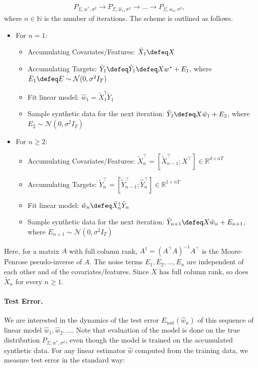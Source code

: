 \begin{align*}
P_{\Sigma,w^*,\sigma^2} \to P_{\Sigma,\hat{w}_1,\sigma^2} \to \ldots \to P_{\Sigma,\hat{w}_n,\sigma^2},
\end{align*}
where $n \in \mathbb{N}$ is the number of iterations. The scheme is outlined as follows.
\begin{itemize}
\item For $n=1$:
\begin{itemize}
\item Accumulating Covariates/Features: $\tilde{X}_1 \defeq X$
\item Accumulating Targets: $\tilde{Y}_1 \defeq \hat{Y}_1 \defeq Xw^* + E_1$, where $E_1 \defeq E \sim \mathcal{N}(0, \sigma^2 I_T)$
\item Fit linear model: $\hat{w}_1 = \tilde{X}_1^{\dagger} \tilde{Y}_1$
\item Sample synthetic data for the next iteration: $\hat{Y}_2 \defeq X\hat{w}_1 + E_2$, where $E_2 \sim \mathcal{N}(0, \sigma^2 I_T)$
\end{itemize}
\item For $n \geq 2$:
\begin{itemize}
\item Accumulating Covariates/Features: $\tilde{X}_n^\top = [\tilde{X}_{n-1}^\top; X^\top] \in \mathbb{R}^{d \times nT}$
\item Accumulating Targets: $\tilde{Y}_n^\top = [\tilde{Y}_{n-1}^\top; \hat{Y}_n^\top] \in \mathbb{R}^{1 \times nT}$
\item Fit linear model: $\hat{w}_n \defeq \tilde{X}_n^{\dagger} \tilde{Y}_n$
\item Sample synthetic data for the next iteration: $\hat{Y}_{n+1} \defeq X \hat{w}_n + E_{n+1}$, where $E_{n+1} \sim \mathcal{N}(0, \sigma^2 I_T)$
\end{itemize}
\end{itemize}
Here, for a matrix $A$ with full column rank, $A^\dagger=(A^\top A)^{-1}A^\top$ is the Moore-Penrose pseudo-inverse of $A$. The noise terms $E_1, E_2, \ldots, E_n$ are independent of each other and of the covariates/features. Since $X$ has full column rank, so does $\tilde{X}_n$ for every $n\geq 1$.

\paragraph{Test Error.}

We are interested in the dynamics of the test error $E_{\text{test}}(\hat{w}_n)$ of this sequence of linear model $\hat{w}_1, \hat{w}_2, ...$. Note that evaluation of the model is done on the true distribution $P_{\Sigma,w^*,\sigma^2}$, even though the model is trained on the accumulated synthetic data. For any linear estimator $\hat{w}$ computed from the training data, we measure test error in the standard way:

